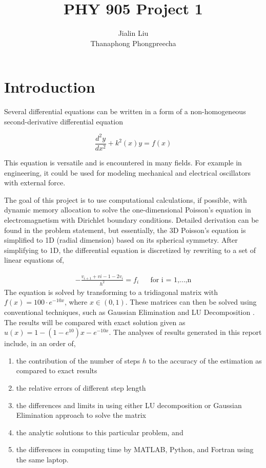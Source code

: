 \documentclass{article}
\begin{document}
\lstset{language=Pascal}          %

\newpage

	\title{PHY 905 Project 1}
	\author{Jialin Liu \\ Thanaphong Phongpreecha}
	\maketitle
	
	\newpage
	
	\section{Introduction}
	Several differential equations can be written in a form of a non-homogeneous second-derivative differential equation 
	
	\begin{equation*}	
	\frac{d^{2}y}{dx^2} + k^2(x)y=f(x)
	\end{equation*}
	
	This equation is versatile and is encountered in many fields. For example in engineering, it could be used for modeling mechanical and electrical oscillators with external force. \cite{example}
	
	The goal of this project is to use computational calculations, if possible, with dynamic memory allocation to solve the one-dimensional Poisson's equation in electromagnetism with Dirichlet boundary conditions. Detailed derivation can be found in the problem statement, but essentially, the 3D Poisson's equation is simplified to 1D (radial dimension) based on its spherical symmetry. After simplifying to 1D, the differential equation is discretized by rewriting to a set of linear equations of,
	
	\begin{align*}
	-\frac{v_{i+1}+v{i-1}-2v_i}{h^2}=f_i && \text{for i = 1,...,n}
	\end{align*}
	The equation is solved by transforming to a tridiagonal matrix with $f(x)=100 \cdot e^{-10x}$, where $x \in (0,1) $. These matrices can then be solved using conventional techniques, such as Gaussian Elimination and LU Decomposition \cite{rice2012applied}. The results will be compared with exact solution given as $u(x)=1-(1-e^{10})x-e^{-10x}$. The analyses of results generated in this report include, in an order of,
	
	\begin{enumerate}
		\item the contribution of the number of steps $h$ to the accuracy of the estimation as compared to exact results 
		\item the relative errors of different step length 
		\item the differences and limits in using either LU decomposition or Gaussian Elimination approach to solve the matrix
		\item the analytic solutions to this particular problem, and 
		\item the differences in computing time by MATLAB, Python, and Fortran using the same laptop.
		
	\end{enumerate}
	
\end{document}
